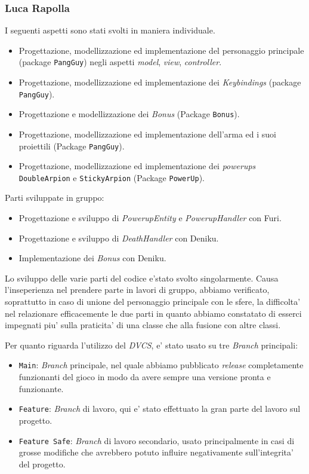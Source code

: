 \documentclass[a4paper,12pt]{report}
\begin{document}
\subsubsection{Luca Rapolla}
I seguenti aspetti sono stati svolti in maniera individuale.
\begin{itemize}
    \item Progettazione, modellizzazione ed implementazione del personaggio principale (package \texttt{PangGuy}) negli aspetti \emph{model}, \emph{view}, \emph{controller}.
    \item Progettazione, modellizzazione ed implementazione dei \emph{Keybindings} (package \texttt{PangGuy}).
    \item Progettazione e modellizzazione dei \emph{Bonus} (Package \texttt{Bonus}).
    \item Progettazione, modellizzazione ed implementazione dell'arma ed i suoi proiettili (Package \texttt{PangGuy}).
    \item Progettazione, modellizzazione ed implementazione dei \emph{powerups} \texttt{DoubleArpion} e \texttt{StickyArpion} (Package \texttt{PowerUp}).
\end{itemize}

Parti sviluppate in gruppo:
\begin{itemize}
    \item Progettazione e sviluppo di \emph{PowerupEntity} e \emph{PowerupHandler} con Furi.
    \item Progettazione e sviluppo di \emph{DeathHandler} con Deniku.
    \item Implementazione dei \emph{Bonus} con Deniku.
\end{itemize}

Lo sviluppo delle varie parti del codice e'stato svolto singolarmente. Causa l'inseperienza nel prendere parte in lavori di gruppo, abbiamo verificato, soprattutto in caso di unione del personaggio principale con le sfere, la difficolta' nel relazionare efficacemente le due parti in quanto abbiamo constatato di esserci impegnati piu' sulla praticita' di una classe che alla fusione con altre classi.

Per quanto riguarda l'utilizzo del \emph{DVCS}, e' stato usato su tre \emph{Branch} principali:
\begin{itemize}
    \item \texttt{Main}: \emph{Branch} principale, nel quale abbiamo pubblicato \emph{release} completamente funzionanti del gioco in modo da avere sempre una versione pronta e funzionante.
    \item \texttt{Feature}: \emph{Branch} di lavoro, qui e' stato effettuato la gran parte del lavoro sul progetto.
    \item \texttt{Feature Safe}: \emph{Branch} di lavoro secondario, usato principalmente in casi di grosse modifiche che avrebbero potuto influire negativamente sull'integrita' del progetto.
\end{itemize}
\end{document}
